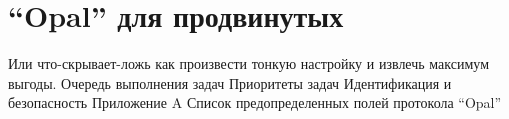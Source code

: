 \part{“Opal” для продвинутых}

Или что-скрывает-ложь как произвести тонкую настройку и извлечь максимум выгоды.
Очередь выполнения задач
Приоритеты задач
Идентификация и безопасность
Приложение A
Список предопределенных полей протокола “Opal”
